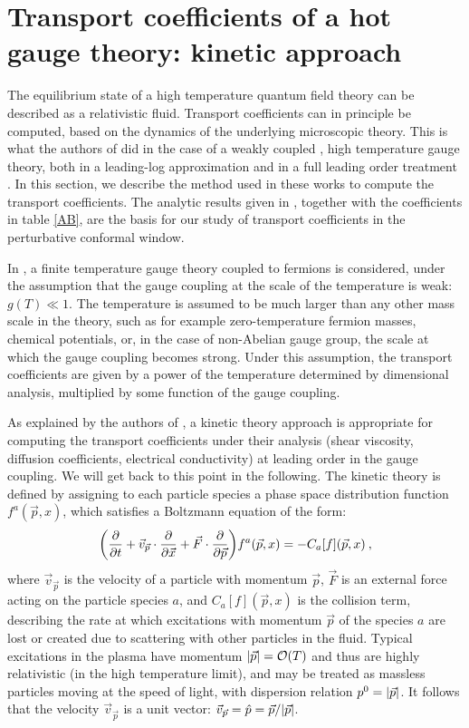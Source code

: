\section{Transport coefficients of a hot gauge theory: kinetic approach}

The equilibrium state of a high temperature quantum field theory can be described as a relativistic fluid. Transport coefficients can in principle be computed, based on the dynamics of the underlying microscopic theory.
This is what the authors of \cite{Arnold:2000dr,Arnold:2003zc} did in the case of a weakly coupled , high temperature gauge theory, both in a leading-log approximation \cite{Arnold:2000dr} and in a full leading order treatment \cite{Arnold:2003zc}.
In this section, we describe the method used in these works to compute the transport coefficients. The analytic results given in \cite{Arnold:2000dr}, together with the coefficients in table \ref{AB}, are the basis for our study of transport coefficients in the perturbative conformal window.

In \cite{Arnold:2000dr,Arnold:2003zc}, a finite temperature gauge theory coupled to fermions is considered, under the assumption that the gauge coupling at the scale of the temperature is weak: $g(T) \ll 1$. The temperature is assumed to be much larger than any other mass scale in the theory, such as for example zero-temperature fermion masses, chemical potentials, or, in the case of non-Abelian gauge group, the scale at which the gauge coupling becomes strong. Under this assumption, the transport coefficients are given by a power of the temperature determined by dimensional analysis, multiplied by some function of the gauge coupling.

As explained by the authors of \cite{Arnold:2000dr,Arnold:2003zc}, a kinetic theory approach is appropriate for computing the transport coefficients under their analysis (shear viscosity, diffusion coefficients, electrical conductivity) at leading order in the gauge coupling. We will get back to this point in the following. The kinetic theory is defined by assigning to each particle species a phase space distribution function $f^a(\vec p, x)$, which satisfies a Boltzmann equation of the form:
\begin{equation}
\biggl( \frac{\partial  }{\partial t}+ \vec v_{\vec p} \cdot \frac{\partial  }{\partial \vec x} + \vec F \cdot \frac{\partial  }{\partial \vec p} \biggr) f^a(\vec p,x) = -C_a[f] (\vec p,x) \: ,
\end{equation}
%
where $\vec v_{\vec p}$ is the velocity of a particle with momentum $\vec p$, $\vec F$ is an external force acting on the particle species $a$, and $C_a[f](\vec p, x)$ is the collision term, describing the rate at which excitations with momentum $\vec p$ of the species $a$ are lost or created due to scattering with other particles in the fluid. Typical excitations in the plasma have momentum $\abs{\vec p} = \mathcal O(T)$ and thus are highly relativistic (in the high temperature limit), and may be treated as massless particles moving at the speed of light, with dispersion relation $p^0= \abs{\vec p}$. It follows that the velocity $\vec v_{\vec p}$ is a unit vector: $\vec v_{\vec p} = \hat p = \vec p/ \abs{\vec p}$. 

